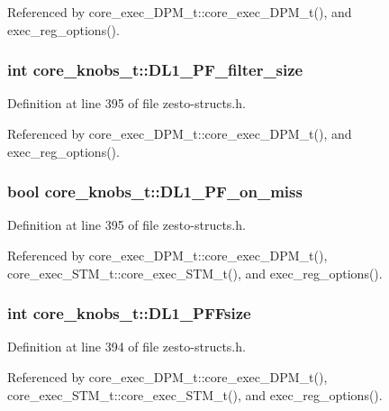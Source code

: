 Referenced by core\_\-exec\_\-DPM\_\-t::core\_\-exec\_\-DPM\_\-t(), and exec\_\-reg\_\-options().
\subsubsection[{DL1\_\-PF\_\-filter\_\-size}]{\setlength{\rightskip}{0pt plus 5cm}int {\bf core\_\-knobs\_\-t::DL1\_\-PF\_\-filter\_\-size}}\label{structcore__knobs__t_bc3707a7222d850e58d39e39548758dd}




Definition at line 395 of file zesto-structs.h.

Referenced by core\_\-exec\_\-DPM\_\-t::core\_\-exec\_\-DPM\_\-t(), and exec\_\-reg\_\-options().
\subsubsection[{DL1\_\-PF\_\-on\_\-miss}]{\setlength{\rightskip}{0pt plus 5cm}bool {\bf core\_\-knobs\_\-t::DL1\_\-PF\_\-on\_\-miss}}\label{structcore__knobs__t_e30cc01edd035359b3ba3e5aaa3591ff}




Definition at line 395 of file zesto-structs.h.

Referenced by core\_\-exec\_\-DPM\_\-t::core\_\-exec\_\-DPM\_\-t(), core\_\-exec\_\-STM\_\-t::core\_\-exec\_\-STM\_\-t(), and exec\_\-reg\_\-options().
\subsubsection[{DL1\_\-PFFsize}]{\setlength{\rightskip}{0pt plus 5cm}int {\bf core\_\-knobs\_\-t::DL1\_\-PFFsize}}\label{structcore__knobs__t_20cc172363c48ad386a7f7f42300df02}




Definition at line 394 of file zesto-structs.h.

Referenced by core\_\-exec\_\-DPM\_\-t::core\_\-exec\_\-DPM\_\-t(), core\_\-exec\_\-STM\_\-t::core\_\-exec\_\-STM\_\-t(), and exec\_\-reg\_\-options().
